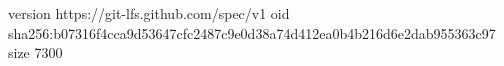 version https://git-lfs.github.com/spec/v1
oid sha256:b07316f4cca9d53647cfc2487c9e0d38a74d412ea0b4b216d6e2dab955363c97
size 7300
